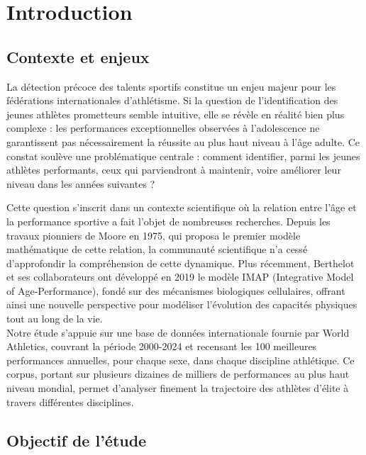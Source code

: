 \documentclass[
  french,
  11pt,
  a4paper,
]{article}
\begin{document}
\newpage

\tableofcontents

\newpage

\section*{Introduction}\label{introduction}

\subsection*{Contexte et enjeux}\label{contexte-et-enjeux}

La détection précoce des talents sportifs constitue un enjeu majeur pour
les fédérations internationales d'athlétisme. Si la question de
l'identification des jeunes athlètes prometteurs semble intuitive, elle
se révèle en réalité bien plus complexe : les performances
exceptionnelles observées à l'adolescence ne garantissent pas
nécessairement la réussite au plus haut niveau à l'âge adulte. Ce
constat soulève une problématique centrale : comment identifier, parmi
les jeunes athlètes performants, ceux qui parviendront à maintenir,
voire améliorer leur niveau dans les années suivantes ?

Cette question s'inscrit dans un contexte scientifique où la relation
entre l'âge et la performance sportive a fait l'objet de nombreuses
recherches. Depuis les travaux pionniers de Moore en 1975, qui proposa
le premier modèle mathématique de cette relation, la communauté
scientifique n'a cessé d'approfondir la compréhension de cette
dynamique. Plus récemment, Berthelot et ses collaborateurs ont développé
en 2019 le modèle IMAP (Integrative Model of Age-Performance), fondé sur
des mécanismes biologiques cellulaires, offrant ainsi une nouvelle
perspective pour modéliser l'évolution des capacités physiques tout au
long de la vie.\\

Notre étude s'appuie sur une base de données internationale fournie par
World Athletics, couvrant la période 2000-2024 et recensant les 100
meilleures performances annuelles, pour chaque sexe, dans chaque
discipline athlétique. Ce corpus, portant sur plusieurs dizaines de
milliers de performances au plus haut niveau mondial, permet d'analyser
finement la trajectoire des athlètes d'élite à travers différentes
disciplines.

\subsection*{Objectif de l'étude}\label{objectif-de-luxe9tude}
\end{document}
